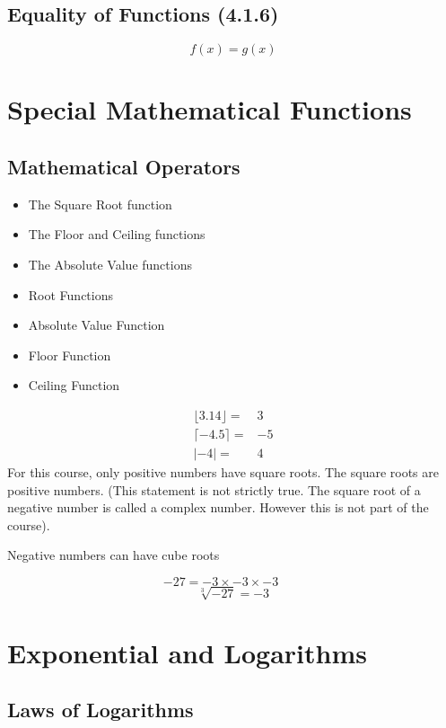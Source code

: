 \documentclass[12pt]{article}
\begin{document}
\subsection*{Equality of Functions (4.1.6)}
\[f(x) = g(x) \]

\section{Special Mathematical Functions}
\subsection{Mathematical Operators}
\begin{itemize}
\item The Square Root function
\item The Floor and Ceiling functions
\item The Absolute Value functions
\end{itemize}


\begin{itemize}
\item Root Functions
\item Absolute Value Function
\item Floor Function
\item Ceiling Function
\end{itemize}
{
\large
\begin{eqnarray}
\lfloor 3.14 \rfloor =& 3 \\
\lceil -4.5 \rceil =& -5 \\
| -4 | =&  4
\end{eqnarray}
}
For this course, only positive numbers have square roots. The square roots are positive numbers. (This statement is not strictly true. The square root of a negative number is called a complex number. However this is not part of the course).

Negative numbers can have cube roots

{
\[ -27 = -3 \times -3 \times -3 \qquad \]
\LARGE
\[ \sqrt[3]{-27} = -3 \]
}

\newpage
\section{Exponential and Logarithms}
\subsection*{Laws of Logarithms}
\end{document}
